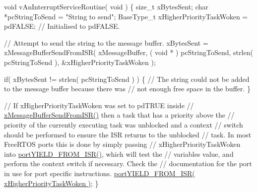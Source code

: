 \begin{DoxyPre}void vAnInterruptServiceRoutine( void )
\{
size\_t xBytesSent;
char *pcStringToSend = "String to send";
BaseType\_t xHigherPriorityTaskWoken = pdFALSE; // Initialised to pdFALSE.\end{DoxyPre}



\begin{DoxyPre} // Attempt to send the string to the message buffer.
 xBytesSent = xMessageBufferSendFromISR( xMessageBuffer,
                                         ( void * ) pcStringToSend,
                                         strlen( pcStringToSend ),
                                         \&xHigherPriorityTaskWoken );\end{DoxyPre}



\begin{DoxyPre} if( xBytesSent != strlen( pcStringToSend ) )
 \{
     // The string could not be added to the message buffer because there was
     // not enough free space in the buffer.
 \}\end{DoxyPre}



\begin{DoxyPre} // If xHigherPriorityTaskWoken was set to pdTRUE inside
 // \hyperlink{message__buffer_8h_aeef5b0c4f8c2db6ca2230a8874813e79}{xMessageBufferSendFromISR()} then a task that has a priority above the
 // priority of the currently executing task was unblocked and a context
 // switch should be performed to ensure the ISR returns to the unblocked
 // task.  In most FreeRTOS ports this is done by simply passing
 // xHigherPriorityTaskWoken into \hyperlink{externals_2freertos_2portable_2_g_c_c_2_a_r_m___c_m0_2portmacro_8h_aac6850c66595efdc02a8bbb95fb4648e}{portYIELD\_FROM\_ISR()}, which will test the
 // variables value, and perform the context switch if necessary.  Check the
 // documentation for the port in use for port specific instructions.
 \hyperlink{vendor_2ceedling_2plugins_2freertos_2vendor_2freertos_2portable_2_g_c_c_2_p_o_s_i_x_2portmacro_8h_aac6850c66595efdc02a8bbb95fb4648e}{portYIELD\_FROM\_ISR( xHigherPriorityTaskWoken )};
\}
\end{DoxyPre}
 